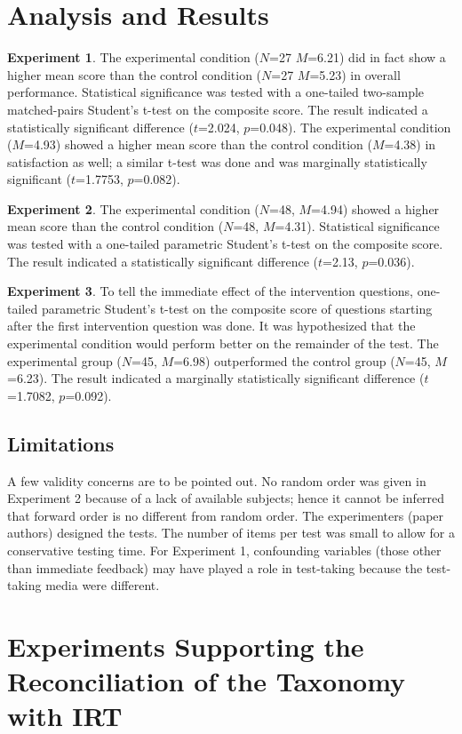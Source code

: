 \section{Analysis and Results}

\textbf{Experiment 1}. The experimental condition ($N$=27 $M$=6.21) did in fact
show a higher mean score than the control condition ($N$=27 $M$=5.23) in
overall performance.  Statistical significance was tested with a one-tailed
two-sample matched-pairs Student's t-test on the composite score. The result
indicated a statistically significant difference ($t$=2.024, $p$=0.048).  The
experimental condition ($M$=4.93) showed a higher mean score than the control
condition ($M$=4.38) in satisfaction as well; a similar t-test was done and was
marginally statistically significant ($t$=1.7753, $p$=0.082).  


\textbf{Experiment 2}. The experimental condition ($N$=48, $M$=4.94) showed a
higher mean score than the control condition ($N$=48, $M$=4.31).  Statistical
significance was tested with a one-tailed parametric Student's t-test on the
composite score.  The result indicated a statistically significant difference
($t$=2.13, $p$=0.036).

\textbf{Experiment 3}. To tell the immediate effect of the intervention
questions, one-tailed parametric Student's t-test on the composite score of
questions starting after the first intervention question was done. It was
hypothesized that the experimental condition would perform better on the
remainder of the test. The experimental group ($N$=45, $M$=6.98) outperformed
the control group ($N$=45, $M$=6.23).  The result indicated a marginally
statistically significant difference ($t$=1.7082, $p$=0.092).

\subsection{Limitations}

A few validity concerns are to be pointed out. No random order was given in
Experiment 2 because of a lack of available subjects; hence it cannot be
inferred that forward order is no different from random order. The
experimenters (paper authors) designed the tests. The number of items per test
was small to allow for a conservative testing time.  For Experiment 1,
confounding variables (those other than immediate feedback) may have played a
role in test-taking because the test-taking media were different.


\section{Experiments Supporting the Reconciliation of the Taxonomy with IRT}

